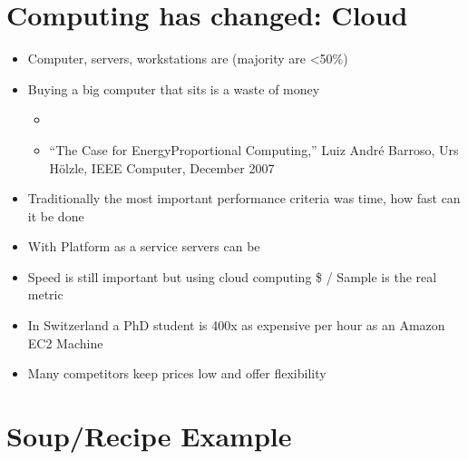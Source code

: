 \documentclass[letterpaper,10pt,english]{sphinxmanual}
\begin{document}
\section{Computing has changed: Cloud}
\label{\detokenize{01-Introduction:computing-has-changed-cloud}}\begin{itemize}
\item {} 
\sphinxAtStartPar
Computer, servers, workstations are  (majority are \textless{}50\%)

\item {} 
\sphinxAtStartPar
Buying a big computer that sits  is a waste of money
\begin{itemize}
\item {} 
\sphinxAtStartPar
{}

\item {} 
\sphinxAtStartPar
“The Case for Energy\sphinxhyphen{}Proportional Computing,” Luiz André Barroso, Urs Hölzle, IEEE Computer, December 2007

\end{itemize}

\item {} 
\sphinxAtStartPar
Traditionally the most important performance criteria was time, how fast can it be done

\item {} 
\sphinxAtStartPar
With Platform as a service servers can be 

\item {} 
\sphinxAtStartPar
Speed is still important but using cloud computing \$ / Sample is the real metric

\item {} 
\sphinxAtStartPar
In Switzerland a PhD student is 400x as expensive per hour as an Amazon EC2 Machine

\item {} 
\sphinxAtStartPar
Many competitors keep prices low and offer flexibility

\end{itemize}




\section{Soup/Recipe Example}
\label{\detokenize{01-Introduction:soup-recipe-example}}
\end{document}
